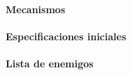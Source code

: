 \paragraph{Mecanismos}

\paragraph{Especificaciones iniciales}
\begin{itemize}
  
  
  
\end{itemize}


\paragraph{Lista de enemigos}

